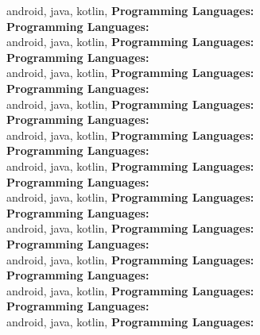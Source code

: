 android, java, kotlin, \textbf{Programming Languages:} \\
\textbf{Programming Languages:} \\
android, java, kotlin, \textbf{Programming Languages:} \\
\textbf{Programming Languages:} \\
android, java, kotlin, \textbf{Programming Languages:} \\
\textbf{Programming Languages:} \\
android, java, kotlin, \textbf{Programming Languages:} \\
\textbf{Programming Languages:} \\
android, java, kotlin, \textbf{Programming Languages:} \\
\textbf{Programming Languages:} \\
android, java, kotlin, \textbf{Programming Languages:} \\
\textbf{Programming Languages:} \\
android, java, kotlin, \textbf{Programming Languages:} \\
\textbf{Programming Languages:} \\
android, java, kotlin, \textbf{Programming Languages:} \\
\textbf{Programming Languages:} \\
android, java, kotlin, \textbf{Programming Languages:} \\
\textbf{Programming Languages:} \\
android, java, kotlin, \textbf{Programming Languages:} \\
\textbf{Programming Languages:} \\
android, java, kotlin, \textbf{Programming Languages:} \\
